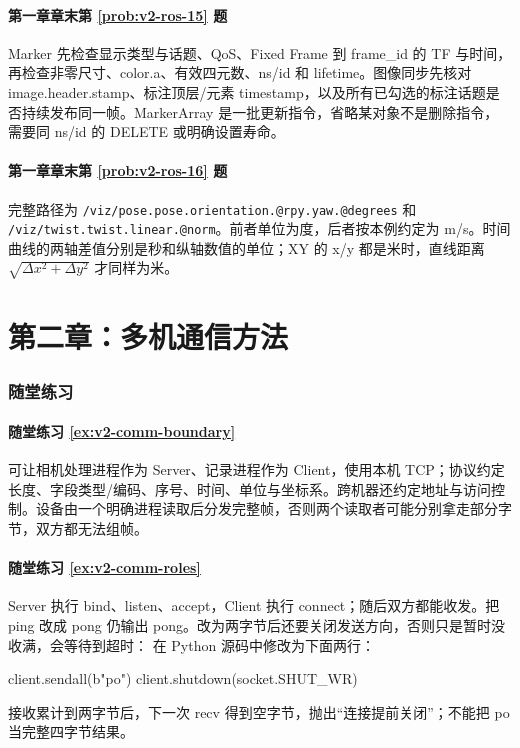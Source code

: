 \paragraph*{第一章章末第 \ref{prob:v2-ros-15} 题}
\begin{solution}
Marker 先检查显示类型与话题、QoS、Fixed Frame 到 frame\_id 的 TF 与时间，再检查非零尺寸、color.a、有效四元数、ns/id 和 lifetime。图像同步先核对 image.header.stamp、标注顶层/元素 timestamp，以及所有已勾选的标注话题是否持续发布同一帧。MarkerArray 是一批更新指令，省略某对象不是删除指令，需要同 ns/id 的 DELETE 或明确设置寿命。
\end{solution}

\paragraph*{第一章章末第 \ref{prob:v2-ros-16} 题}
\begin{solution}
完整路径为 \nolinkurl{/viz/pose.pose.orientation.@rpy.yaw.@degrees} 和 \nolinkurl{/viz/twist.twist.linear.@norm}。前者单位为度，后者按本例约定为 m/s。时间曲线的两轴差值分别是秒和纵轴数值的单位；XY 的 x/y 都是米时，直线距离 $\sqrt{\Delta x^2+\Delta y^2}$ 才同样为米。
\end{solution}

\section*{第二章：多机通信方法}
{}
\subsubsection*{随堂练习}

\paragraph*{随堂练习 \ref{ex:v2-comm-boundary}}
\begin{solution}
可让相机处理进程作为 Server、记录进程作为 Client，使用本机 TCP；协议约定长度、字段类型/编码、序号、时间、单位与坐标系。跨机器还约定地址与访问控制。设备由一个明确进程读取后分发完整帧，否则两个读取者可能分别拿走部分字节，双方都无法组帧。
\end{solution}

\paragraph*{随堂练习 \ref{ex:v2-comm-roles}}
\begin{solution}
Server 执行 bind、listen、accept，Client 执行 connect；随后双方都能收发。把 ping 改成 pong 仍输出 pong。改为两字节后还要关闭发送方向，否则只是暂时没收满，会等待到超时：
在 Python 源码中修改为下面两行：
\begin{tpython}
client.sendall(b"po")
client.shutdown(socket.SHUT_WR)
\end{tpython}
接收累计到两字节后，下一次 recv 得到空字节，抛出“连接提前关闭”；不能把 po 当完整四字节结果。
\end{solution}

